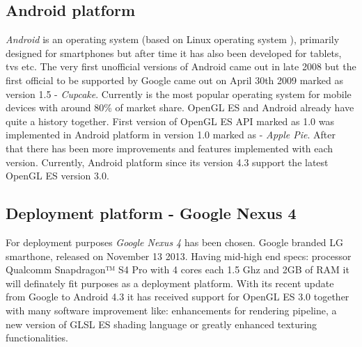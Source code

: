 \subsection{Android platform}
\emph{Android} \cite{androidcom} is an operating system (based on Linux operating system \cite{gnulinux}), primarily designed for smartphones but after time it has also been developed for tablets, tvs etc.
The very first unofficial versions of Android came out in late 2008 but the first official to be supported by Google came out on April 30th 2009 marked as version 1.5 - \emph{Cupcake}.
\newline Currently is the most popular operating system for mobile devices with around 80\% of market share.
OpenGL ES and Android already have quite a history together.
First version of OpenGL ES API marked as 1.0 was implemented in Android platform in version 1.0 marked as - \emph{Apple Pie}.
After that there has been more improvements and features implemented with each version.
Currently, Android platform since its version 4.3 support the latest OpenGL ES version 3.0.

\subsection{Deployment platform - Google Nexus 4}
For deployment purposes \emph{Google Nexus 4} has been chosen.
Google branded LG smarthone, released on November 13 2013.
\newline Having mid-high end specs: processor Qualcomm Snapdragon™ S4 Pro with 4 cores each 1.5 Ghz and 2GB of RAM it will definately fit purposes as a deployment platform.
\newline With its recent update from Google to Android 4.3 it has received support for OpenGL ES 3.0 together with many software improvement like: enhancements for rendering pipeline, a new version of GLSL ES shading language or greatly enhanced texturing functionalities.
